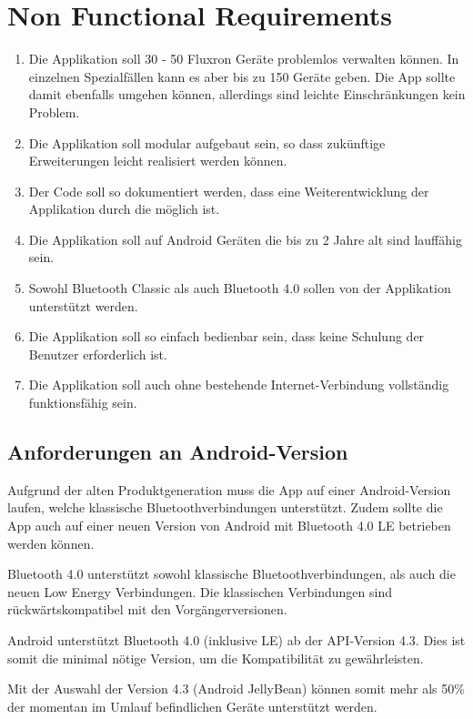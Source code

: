 
\section{Non Functional Requirements}
\label{sec:Non Functional Requirements}

\begin{enumerate}
\item Die Applikation soll 30 - 50 Fluxron Geräte problemlos verwalten können. In einzelnen Spezialfällen kann es aber bis zu 150 Geräte geben. Die App sollte damit ebenfalls umgehen können, allerdings sind leichte Einschränkungen kein Problem.
\item Die Applikation soll modular aufgebaut sein, so dass zukünftige Erweiterungen leicht realisiert werden können.
\item Der Code soll so dokumentiert werden, dass eine Weiterentwicklung der Applikation durch die \fluxron{} möglich ist.
\item Die Applikation soll auf Android Geräten die bis zu 2 Jahre alt sind lauffähig sein.
\item Sowohl Bluetooth Classic als auch Bluetooth 4.0 sollen von der Applikation unterstützt werden.
\item Die Applikation soll so einfach bedienbar sein, dass keine Schulung der Benutzer erforderlich ist.
\item Die Applikation soll auch ohne bestehende Internet-Verbindung vollständig funktionsfähig sein.
\end{enumerate}


\subsection{Anforderungen an Android-Version}
\label{subsec:Non Functional Requirements}
Aufgrund der alten Produktgeneration muss die App auf einer Android-Version laufen, welche klassische Bluetoothverbindungen unterstützt. Zudem sollte die App auch auf einer neuen Version von Android mit Bluetooth 4.0 \ac{LE} betrieben werden können.

Bluetooth 4.0 unterstützt sowohl klassische Bluetoothverbindungen, als auch die neuen Low Energy Verbindungen. Die klassischen Verbindungen sind rückwärtskompatibel mit den Vorgängerversionen.\cite{bt_standard}

Android unterstützt Bluetooth 4.0 (inklusive \ac{LE}) ab der API-Version 4.3\cite{bt_android}. Dies ist somit die minimal nötige Version, um die Kompatibilität zu gewährleisten.

Mit der Auswahl der Version 4.3 (Android JellyBean) können somit mehr als 50\% der momentan im Umlauf \cite{android_distribution} befindlichen Geräte unterstützt werden.
